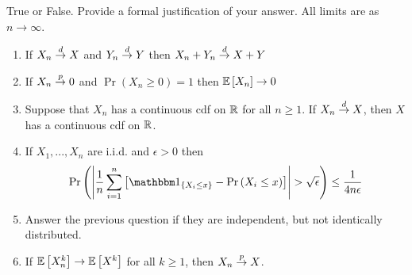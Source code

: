 \documentclass[12pt, letterpaper]{paper}
\begin{document}
\begin{question}
  True or False. Provide a formal justification of your answer. All
  limits are as $n \to \infty$.
  \begin{enumerate}
  \item If $X_n \overset{d}{\to} X$ and $Y_n \overset{d}{\to} Y$ then $X_n + Y_n
    \overset{d}{\to} X + Y$
  \item If $X_n \overset{p}{\to} 0$ and $\Pr \left(  X_n \geq 0 \right ) = 1$ then $\mathbb{E} \left [ X_n \right ] \to 0$
  \item Suppose that $X_n$ has a continuous cdf on $\mathbb{R}$ for all $n
    \geq 1$. If $X_n \overset{d}{\to} X$, then $X$ has a continuous cdf on
    $\mathbb{R}$.
  \item If $X_1, ..., X_n$ are i.i.d. and $\epsilon > 0$ then
    \begin{equation*}
      \Pr \left( \abs{\frac{1}{n} \sum_{i = 1}^n \brak{ \indicate{ X_i \leq
              x} - \Pr \left(  X_i \leq x \right )}} > \sqrt{\epsilon} \right) \leq \frac{1}{4 n \epsilon}
    \end{equation*}
  \item Answer the previous question if they are independent, but not
    identically distributed.
  \item If $\mathbb{E} \left [ X_n^k \right ] \to \mathbb{E} \left [ X^k \right ]$ for all $k \geq 1$, then $X_n \overset{p}{\to} X$.

  \end{enumerate}
  

\end{question}
\end{document}

